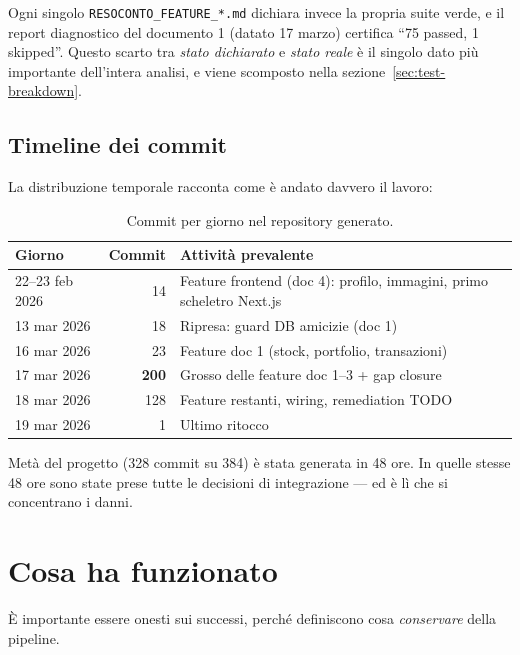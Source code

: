 \documentclass[11pt,a4paper]{article}
\newcommand{\warn}[1]{\textcolor{warnorange}{\textbf{#1}}}
\newcommand{\file}[1]{\texttt{\small #1}}
\begin{document}
Ogni singolo \file{RESOCONTO\_FEATURE\_*.md} dichiara invece la propria suite verde, e il report diagnostico del documento 1 (datato 17 marzo) certifica ``75 passed, 1 skipped''. Questo scarto tra \emph{stato dichiarato} e \emph{stato reale} \`e il singolo dato pi\`u importante dell'intera analisi, e viene scomposto nella sezione~\ref{sec:test-breakdown}.

\subsection{Timeline dei commit}
La distribuzione temporale racconta come \`e andato davvero il lavoro:

\begin{table}[h!]
\centering
\small
\begin{tabular}{lrl}
\toprule
\textbf{Giorno} & \textbf{Commit} & \textbf{Attivit\`a prevalente} \\
\midrule
22--23 feb 2026 & 14 & Feature frontend (doc 4): profilo, immagini, primo scheletro Next.js \\
13 mar 2026 & 18 & Ripresa: guard DB amicizie (doc 1) \\
16 mar 2026 & 23 & Feature doc 1 (stock, portfolio, transazioni) \\
17 mar 2026 & \warn{200} & Grosso delle feature doc 1--3 + gap closure \\
18 mar 2026 & 128 & Feature restanti, wiring, remediation TODO \\
19 mar 2026 & 1 & Ultimo ritocco \\
\bottomrule
\end{tabular}
\caption{Commit per giorno nel repository generato.}
\end{table}

Met\`a del progetto (328 commit su 384) \`e stata generata in 48 ore. In quelle stesse 48 ore sono state prese tutte le decisioni di integrazione --- ed \`e l\`i che si concentrano i danni.

\section{Cosa ha funzionato}

\`E importante essere onesti sui successi, perch\'e definiscono cosa \emph{conservare} della pipeline.
\end{document}
